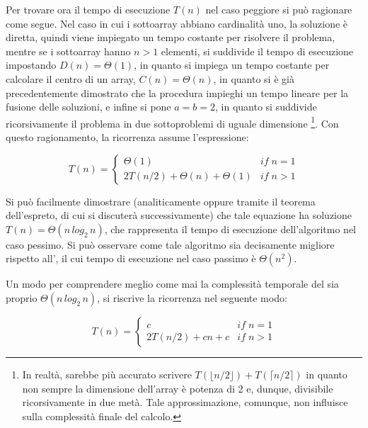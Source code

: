 Per trovare ora il tempo di esecuzione \(T(n)\) nel caso peggiore si può ragionare come segue. Nel caso in cui i sottoarray abbiano cardinalità uno, la soluzione è diretta, quindi viene impiegato un tempo costante per risolvere il problema, mentre se i sottoarray hanno \(n > 1\) elementi, si suddivide il tempo di esecuzione impostando \(D(n) = \Theta(1)\), in quanto si impiega un tempo costante per calcolare il centro di un array, \(C(n)=\Theta(n)\), in quanto si è già precedentemente dimostrato che la procedura  impieghi un tempo lineare per la fusione delle soluzioni, e infine si pone \(a=b=2\), in quanto si suddivide ricorsivamente il problema in due sottoproblemi di uguale dimensione \footnote{In realtà, sarebbe più accurato scrivere \(T(\lfloor n/2 \rfloor) + T(\lceil n/2 \rceil)\) in quanto non sempre la dimensione dell'array  è potenza di 2 e, dunque, divisibile ricorsivamente in due metà. Tale approssimazione, comunque, non influisce sulla complessità finale del calcolo.}. Con questo ragionamento, la ricorrenza assume l'espressione:

\begin{equation*}
  T(n)=\begin{cases}
    \Theta(1) & if\; n=1\\
    2T(n/2)+\Theta(n)+\Theta(1) & if\; n>1
  \end{cases}
\end{equation*}

Si può facilmente dimostrare (analiticamente oppure tramite il teorema dell'espreto, di cui si discuterà successivamente) che tale equazione ha soluzione \(T(n)=\Theta(n\,log_2\,n)\), che rappresenta il tempo di esecuzione dell'algoritmo  nel caso pessimo. Si può osservare come tale algoritmo sia decisamente migliore rispetto all', il cui tempo di esecuzione nel caso passimo è \(\Theta(n^2)\).

Un modo per comprendere meglio come mai la complessità temporale del  sia proprio \(\Theta(n\,log_2\,n)\), si riscrive la ricorrenza nel seguente modo:

\begin{equation*}
  T(n)=\begin{cases}
    c & if\; n=1\\
    2T(n/2)+cn+c & if\; n>1
  \end{cases}
\end{equation*}

